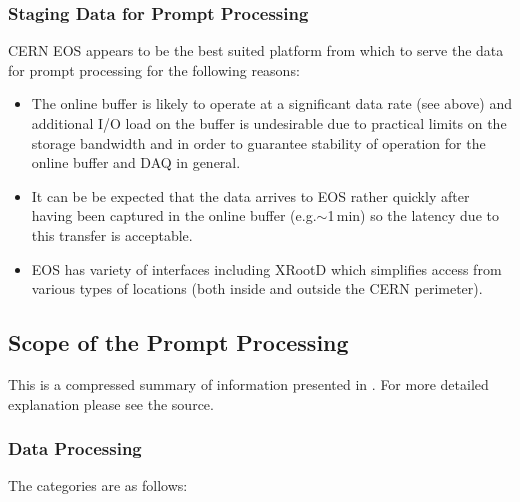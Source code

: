 \documentclass[pdftex,12pt,letter]{article}
\newcommand{\xrd}{XRootD\xspace}
\begin{document}
\subsubsection{Staging Data for Prompt Processing}
CERN EOS appears to be the best suited platform from which to
serve the data for prompt processing for the following reasons:
\begin{itemize}

\item The online buffer is likely to operate at a significant data rate (see above) and additional I/O load on the buffer is undesirable
due to practical limits on the storage bandwidth and in order to guarantee stability of operation for the online buffer and DAQ in general.

\item It can be be expected that the data arrives to EOS rather quickly after having been captured in the online buffer (e.g.$\sim$1\,min) so
the latency due to this transfer is acceptable.

\item EOS has variety of interfaces including \xrd which simplifies access from various types of locations (both inside and outside the CERN perimeter).

\end{itemize}


\subsection{Scope of the Prompt Processing}
This is a compressed summary of information presented in \cite{docdb1811}.
For more detailed explanation please see the source.

\subsubsection{Data Processing}
\label{sec:categories}
The categories are as follows:
\end{document}
